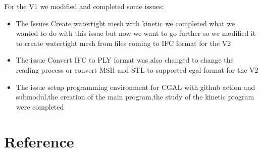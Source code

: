 \documentclass{article}
\begin{document}
For the V1 we modified and completed some issues:
\begin{itemize}
  \item The Issues Create watertight mesh with kinetic we completed what we wanted to do with this issue but now we want to go further so we modified it 
  to create watertight mesh from files coming to IFC format for the V2
  \item The issue Convert IFC to PLY format was also changed to change the reading process or convert MSH and STL to supported cgal format for the V2
  \item The issue setup programming environment for CGAL with github action and submodul,the creation of the main program,the study of the kinetic program were completed 
\end{itemize}

    
\nocite{*}
\section{Reference}


\end{document}
